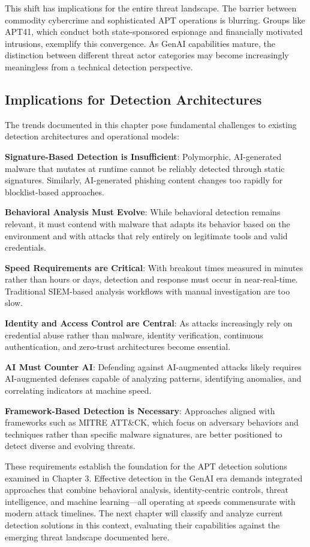 This shift has implications for the entire threat landscape. The barrier between commodity cybercrime and sophisticated APT operations is blurring. Groups like APT41, which conduct both state-sponsored espionage and financially motivated intrusions, exemplify this convergence. As GenAI capabilities mature, the distinction between different threat actor categories may become increasingly meaningless from a technical detection perspective.

\subsection{Implications for Detection Architectures}

The trends documented in this chapter pose fundamental challenges to existing detection architectures and operational models:

\textbf{Signature-Based Detection is Insufficient}: Polymorphic, AI-generated malware that mutates at runtime cannot be reliably detected through static signatures. Similarly, AI-generated phishing content changes too rapidly for blocklist-based approaches.

\textbf{Behavioral Analysis Must Evolve}: While behavioral detection remains relevant, it must contend with malware that adapts its behavior based on the environment and with attacks that rely entirely on legitimate tools and valid credentials.

\textbf{Speed Requirements are Critical}: With breakout times measured in minutes rather than hours or days, detection and response must occur in near-real-time. Traditional SIEM-based analysis workflows with manual investigation are too slow.

\textbf{Identity and Access Control are Central}: As attacks increasingly rely on credential abuse rather than malware, identity verification, continuous authentication, and zero-trust architectures become essential.

\textbf{AI Must Counter AI}: Defending against AI-augmented attacks likely requires AI-augmented defenses capable of analyzing patterns, identifying anomalies, and correlating indicators at machine speed.

\textbf{Framework-Based Detection is Necessary}: Approaches aligned with frameworks such as MITRE ATT\&CK, which focus on adversary behaviors and techniques rather than specific malware signatures, are better positioned to detect diverse and evolving threats.

These requirements establish the foundation for the APT detection solutions examined in Chapter 3. Effective detection in the GenAI era demands integrated approaches that combine behavioral analysis, identity-centric controls, threat intelligence, and machine learning---all operating at speeds commensurate with modern attack timelines. The next chapter will classify and analyze current detection solutions in this context, evaluating their capabilities against the emerging threat landscape documented here.

